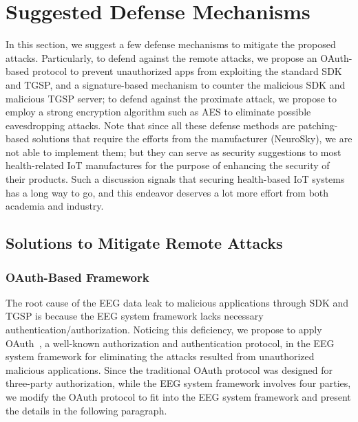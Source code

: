 \section{Suggested Defense Mechanisms}
\label{sec:defense}

In this section, we suggest a few defense mechanisms to mitigate the proposed attacks. Particularly, to defend against the remote attacks, we propose an OAuth-based protocol to prevent unauthorized apps from exploiting the standard SDK and TGSP, and a signature-based mechanism to counter the malicious SDK and malicious TGSP server; to defend against the proximate attack, we propose to employ a strong encryption algorithm such as AES to eliminate possible eavesdropping attacks. Note that since all these defense methods are patching-based solutions that require the efforts from the manufacturer (NeuroSky), we are not able to implement them; but they can %
serve as security suggestions to most health-related IoT manufactures for the purpose of enhancing the security of their products. Such a discussion signals that securing health-based IoT systems has a long way to go, and this endeavor deserves a lot more effort from both academia and industry.

\subsection{Solutions to Mitigate Remote Attacks}

\subsubsection{OAuth-Based Framework}

The root cause of the EEG data leak to malicious applications through SDK and TGSP is because the EEG system framework lacks necessary authentication/authorization. Noticing this deficiency,  we propose to apply OAuth~\cite{hardt2012oauth}, a well-known authorization and authentication protocol, in the EEG system framework for eliminating the attacks resulted from unauthorized malicious applications. Since the traditional OAuth protocol was designed for three-party authorization, while the EEG system framework involves four parties, we modify the OAuth protocol to fit into the EEG system framework and present the details in the following paragraph.

